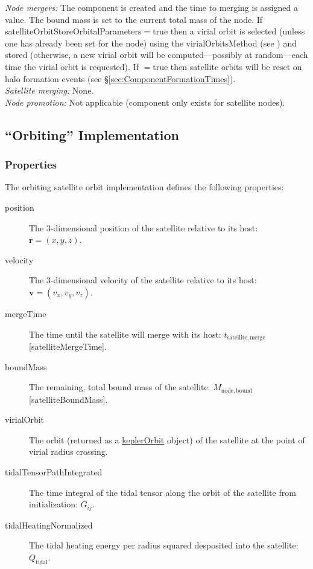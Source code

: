 \noindent\emph{Node mergers:} The \gls{component} is created and the time to merging is assigned a value. The bound mass is set to the current total mass of the node. If {\normalfont \ttfamily satelliteOrbitStoreOrbitalParameters}$=${\normalfont \ttfamily true} then a virial orbit is selected (unless one has already been set for the node) using the {\normalfont \ttfamily virialOrbitsMethod} (see ) and stored (otherwise, a new virial orbit will be computed---possibly at random---each time the virial orbit is requested). If {\normalfont \ttfamily [satelliteOrbitResetOnHaloFormation]}$=${\normalfont \ttfamily true} then satellite orbits will be reset on halo formation events (see \S\ref{sec:ComponentFormationTimes}).\\

\noindent\emph{Satellite merging:} None.\\

\noindent\emph{Node promotion:} Not applicable (component only exists for satellite nodes).\\

\subsection{``Orbiting'' Implementation}\label{sec:ComponentSatelliteOrbiting}

\subsubsection{Properties}

The orbiting satellite orbit implementation defines the following properties:
\begin{description}
 \item [{\normalfont \ttfamily position}] The 3-dimensional position of the satellite relative to its host: $\mathbf{r}=(x,y,z)$.
 \item [{\normalfont \ttfamily velocity}] The 3-dimensional velocity of the satellite relative to its host: $\mathbf{v}=(v_x,v_y,v_z)$.
 \item [{\normalfont \ttfamily mergeTime}] The time until the satellite will merge with its host: $t_\mathrm{satellite, merge}$ [{\normalfont \ttfamily satelliteMergeTime}].
 \item [{\normalfont \ttfamily boundMass}] The remaining, total bound mass of the satellite: $M_\mathrm{node,bound}$ [{\normalfont \ttfamily satelliteBoundMass}].
 \item[{\normalfont \ttfamily virialOrbit}] The orbit (returned as a \href{https://github.com/galacticusorg/galacticus/releases/download/masterRelease/Galacticus_Development.pdf\#sec.KeplerOrbits}{\normalfont \ttfamily keplerOrbit} object) of the satellite at the point of virial radius crossing.
 \item[{\normalfont \ttfamily tidalTensorPathIntegrated}] The time integral of the tidal tensor along the orbit of the satellite from initialization: $G_{ij}$.
 \item[{\normalfont \ttfamily tidalHeatingNormalized}] The tidal heating energy per radius squared desposited into the satellite: $Q_\mathrm{tidal}$.
\end{description}

